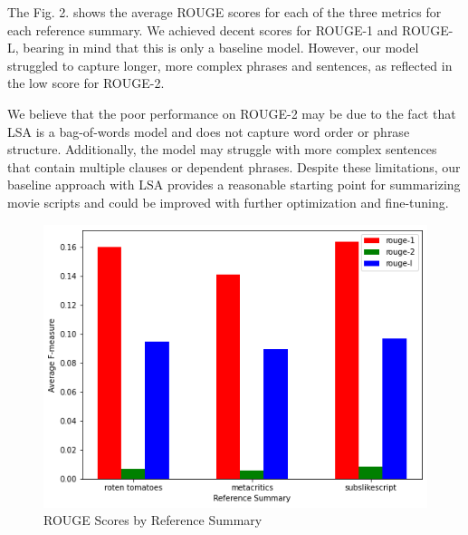\documentclass[fleqn,moreauthors,10pt]{ds_report}
\begin{document}
The Fig. 2. shows the average ROUGE scores for each of the three metrics for each reference summary. We achieved decent scores for ROUGE-1 and ROUGE-L, bearing in mind that this is only a baseline model.  However, our model struggled to capture longer, more complex phrases and sentences, as reflected in the low score for ROUGE-2.

We believe that the poor performance on ROUGE-2 may be due to the fact that LSA is a bag-of-words model and does not capture word order or phrase structure. Additionally, the model may struggle with more complex sentences that contain multiple clauses or dependent phrases. Despite these limitations, our baseline approach with LSA provides a reasonable starting point for summarizing movie scripts and could be improved with further optimization and fine-tuning. 

\begin{figure}[h]
\begin{center}
\includegraphics[width=1.0\columnwidth]{rouge_scores.png}
\end{center}
\caption{ROUGE Scores by Reference Summary}
\label{fig1}
\end{figure}






\end{document}

